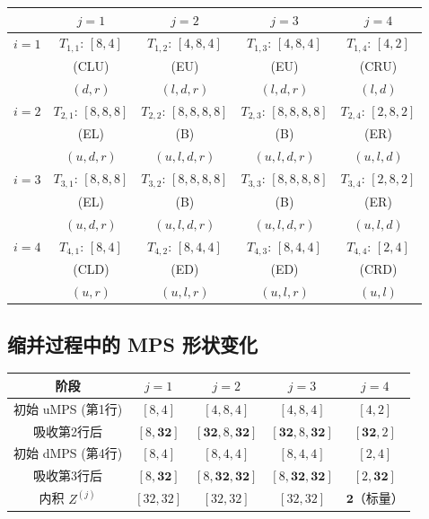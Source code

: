 \documentclass[12pt,a4paper]{article}
\begin{document}
\begin{center}
\renewcommand{\arraystretch}{1.5}
\begin{tabular}{c|c|c|c|c}
\toprule
& $j=1$ & $j=2$ & $j=3$ & $j=4$ \\
\midrule
$i=1$ & $T_{1,1}$: $[8,4]$ & $T_{1,2}$: $[4,8,4]$ & $T_{1,3}$: $[4,8,4]$ & $T_{1,4}$: $[4,2]$ \\
& (CLU) & (EU) & (EU) & (CRU) \\
& $(d,r)$ & $(l,d,r)$ & $(l,d,r)$ & $(l,d)$ \\
\midrule
$i=2$ & $T_{2,1}$: $[8,8,8]$ & $T_{2,2}$: $[8,8,8,8]$ & $T_{2,3}$: $[8,8,8,8]$ & $T_{2,4}$: $[2,8,2]$ \\
& (EL) & (B) & (B) & (ER) \\
& $(u,d,r)$ & $(u,l,d,r)$ & $(u,l,d,r)$ & $(u,l,d)$ \\
\midrule
$i=3$ & $T_{3,1}$: $[8,8,8]$ & $T_{3,2}$: $[8,8,8,8]$ & $T_{3,3}$: $[8,8,8,8]$ & $T_{3,4}$: $[2,8,2]$ \\
& (EL) & (B) & (B) & (ER) \\
& $(u,d,r)$ & $(u,l,d,r)$ & $(u,l,d,r)$ & $(u,l,d)$ \\
\midrule
$i=4$ & $T_{4,1}$: $[8,4]$ & $T_{4,2}$: $[8,4,4]$ & $T_{4,3}$: $[8,4,4]$ & $T_{4,4}$: $[2,4]$ \\
& (CLD) & (ED) & (ED) & (CRD) \\
& $(u,r)$ & $(u,l,r)$ & $(u,l,r)$ & $(u,l)$ \\
\bottomrule
\end{tabular}
\end{center}

\subsection{缩并过程中的 MPS 形状变化}

\begin{center}
\renewcommand{\arraystretch}{1.5}
\begin{tabular}{c|c|c|c|c}
\toprule
\textbf{阶段} & $j=1$ & $j=2$ & $j=3$ & $j=4$ \\
\midrule
初始 uMPS (第1行) & $[8,4]$ & $[4,8,4]$ & $[4,8,4]$ & $[4,2]$ \\
吸收第2行后 & $[8,\mathbf{32}]$ & $[\mathbf{32},8,\mathbf{32}]$ & $[\mathbf{32},8,\mathbf{32}]$ & $[\mathbf{32},2]$ \\
\midrule
初始 dMPS (第4行) & $[8,4]$ & $[8,4,4]$ & $[8,4,4]$ & $[2,4]$ \\
吸收第3行后 & $[8,\mathbf{32}]$ & $[8,\mathbf{32},\mathbf{32}]$ & $[8,\mathbf{32},\mathbf{32}]$ & $[2,\mathbf{32}]$ \\
\midrule
内积 $Z^{(j)}$ & $[32,32]$ & $[32,32]$ & $[32,32]$ & $\mathbf{2}$（标量） \\
\bottomrule
\end{tabular}
\end{center}
\end{document}
